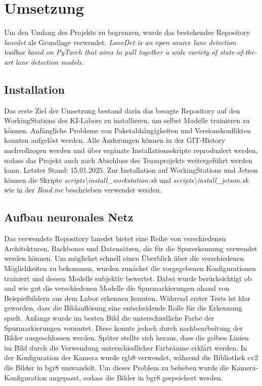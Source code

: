 \documentclass{article}
\begin{document}
    \section{Umsetzung}
        Um den Umfang des Projekts zu begrenzen, wurde das bestehendee Repository \textit{lanedet} als Grundlage verwendet.
        \textit{LaneDet is an open source lane detection toolbox based on PyTorch that aims to pull together a wide variety of state-of-the-art lane detection models.}

        \subsection{Installation}
            Das erste Ziel der Umsetzung bestand darin das besagte Repository auf den WorkingStations des KI-Labors zu installieren, um selbst Modelle trainieren zu können.
            Anfängliche Probleme von Paketabhängigkeiten und Versionskonflikten konnten aufgelöst werden. 
            Alle Änderungen können in der GIT-History nachvollzogen werden und über ergänzte Installationsskripte reproduziert werden, sodass das Projekt auch nach Abschluss des Teamprojekts weitergeführt werden kann. Letzter Stand: 15.01.2025. %
            Zur Installation auf WorkingStations und Jetson können die Skripte \textit{scripts\textbackslash install\_workstation.sh} und \textit{scripts\textbackslash install\_jetson.sh} wie in der \textit{Read.me} beschrieben verwendet werden.

        \subsection{Aufbau neuronales Netz}
            Das verwendete Repository lanedet bietet eine Reihe von verschiedenen Architekturen, Backbones und Datensätzen, die für die Spurerkennung verwendet werden können.
            Um möglichst schnell einen Überblick über die verschiedenen Möglichkeiten zu bekommen, wurden zunächst die vorgegebenen Konfigurationen trainiert und dessen Modelle subjektiv bewertet.
            Dabei wurde berücksichtigt ob und wie gut die verschiedenen Modelle die Spurmarkierungen ahand von Beispielbildern aus dem Labor erkennen konnten.
            Während erster Tests ist klar geworden, dass die Bildauflösung eine entscheidende Rolle für die Erkennung spielt. Anfangs wurde im besten Bild die unterschiedliche Farbe der Spurmarkierungen vermutet. Diese konnte jedoch durch nachbearbeitung der Bilder ausgeschlossen werden. Später stellte sich heraus, dass die gelben Linien im Bild durch die Verwendung unterschiedlicher Farbräume erklärt werden. In der Konfiguration der Kamera wurde rgb8 verwendet, während die Bibliothek cv2 die Bilder in bgr8 umwandelt. Um dieses Problem zu beheben wurde die Kamera-Konfiguration angepasst, sodass die Bilder in bgr8 gespeichert werden.
\end{document}

